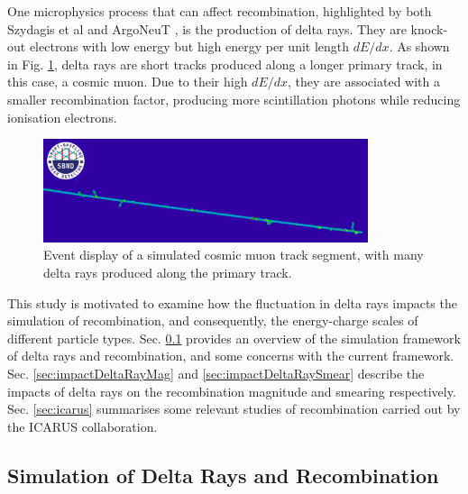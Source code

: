 One microphysics process that can affect recombination, highlighted by both Szydagis et al \cite{NEST} and ArgoNeuT \cite{argoneut_recomb}, is the production of delta rays.
They are knock-out electrons with low energy but high energy per unit length $dE/dx$.
As shown in Fig. \ref{fig:delta_ray_evd}, delta rays are short tracks produced along a longer primary track, in this case, a cosmic muon.                      
Due to their high $dE/dx$, they are associated with a smaller recombination factor, producing more scintillation photons while reducing ionisation electrons.

\begin{figure}[bp!] 
\centering    
\includegraphics[width=0.85\textwidth]{delta_ray_evd}
\caption[Event Display of a Cosmic Muon and Delta Rays]{
Event display of a simulated cosmic muon track segment, with many delta rays produced along the primary track.
}
\label{fig:delta_ray_evd}
\end{figure}

This study is motivated to examine how the fluctuation in delta rays impacts the simulation of recombination, and consequently, the energy-charge scales of different particle types.
Sec. \ref{sec:simDeltaRay} provides an overview of the simulation framework of delta rays and recombination, and some concerns with the current framework.
Sec. \ref{sec:impactDeltaRayMag} and \ref{sec:impactDeltaRaySmear} describe the impacts of delta rays on the recombination magnitude and smearing respectively.
Sec. \ref{sec:icarus} summarises some relevant studies of recombination carried out by the ICARUS collaboration.


\subsection{Simulation of Delta Rays and Recombination}
\label{sec:simDeltaRay}

